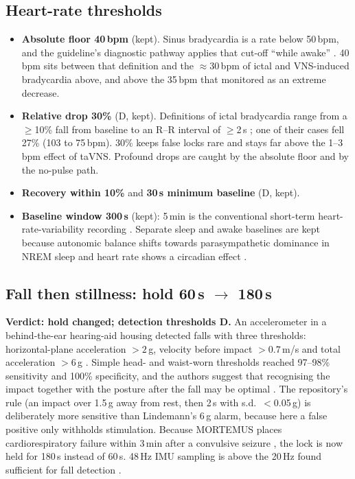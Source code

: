 \documentclass[10pt,a4paper]{article}
\newcommand{\becomes}{\texorpdfstring{$\rightarrow$}{to}}
\newcommand{\lvl}[1]{\textsf{\small #1}}
\begin{document}
\subsection{Heart-rate thresholds}
\begin{itemize}
  \item \textbf{Absolute floor 40\,bpm} (kept). Sinus bradycardia is a rate below 50\,bpm, and the guideline's
        diagnostic pathway applies that cut-off ``while awake'' \parencite{acc2018gms,kusumoto2019}. 40\,bpm sits
        between that definition and the $\approx$30\,bpm of ictal and VNS-induced bradycardia above, and above the
        35\,bpm that \textcite{badran2018} monitored as an extreme decrease.
  \item \textbf{Relative drop 30\%} (\lvl{D}, kept). Definitions of ictal bradycardia range from a $\ge$10\% fall from
        baseline to an R--R interval of $\ge$2\,s \parencite{muccioli2024}; one of their cases fell 27\% (103 to
        75\,bpm). 30\% keeps false locks rare and stays far above the 1--3\,bpm effect of taVNS. Profound drops are
        caught by the absolute floor and by the no-pulse path.
  \item \textbf{Recovery within 10\%} and \textbf{30\,s minimum baseline} (\lvl{D}, kept).
  \item \textbf{Baseline window 300\,s} (kept): 5\,min is the conventional short-term heart-rate-variability recording
        \parencite{shaffer2017}. Separate sleep and awake baselines are kept because autonomic balance shifts towards
        parasympathetic dominance in NREM sleep and heart rate shows a circadian effect \parencite{trinder2001}.
\end{itemize}

\subsection{Fall then stillness: hold 60\,s \becomes{} 180\,s}\label{sec:fall}
\textbf{Verdict: hold changed; detection thresholds \lvl{D}.} An accelerometer in a behind-the-ear hearing-aid housing
detected falls with three thresholds: horizontal-plane acceleration $>2$\,g, velocity before impact $>0.7$\,m/s and
total acceleration $>6$\,g \parencite{lindemann2005}. Simple head- and waist-worn thresholds reached 97--98\%
sensitivity and 100\% specificity, and the authors suggest that recognising the impact together with the posture after
the fall may be optimal \parencite{kangas2008}. The repository's rule (an
impact over 1.5\,g away from rest, then 2\,s with s.d.\ $<$0.05\,g) is deliberately more sensitive than Lindemann's
6\,g alarm, because here a false positive only withholds stimulation. Because MORTEMUS places cardiorespiratory failure
within 3\,min after a convulsive seizure \parencite{ryvlin2013}, the lock is now held for 180\,s instead of 60\,s. 48\,Hz
IMU sampling is above the 20\,Hz found sufficient for fall detection \parencite{villa2025}.
\end{document}
